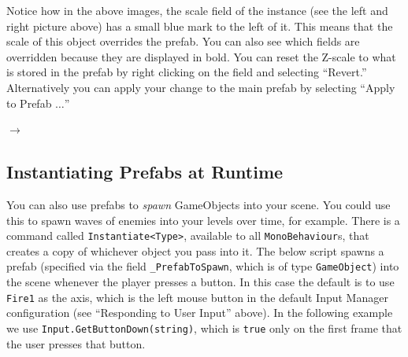 \documentclass[11pt]{article}
\begin{document}
Notice how in the above images, the scale field of the instance (see the left and right picture 
above) has a small blue mark to the left of it.  This means that the scale of this object overrides
the prefab.  You can also see which fields are overridden because they are displayed in bold.
You can reset the Z-scale to what is stored in the prefab by right clicking on the field and selecting
``Revert.''  Alternatively you can apply your change to the main prefab by selecting ``Apply to 
Prefab $\dots$''

\begin{center}
 $\rightarrow$
\end{center}

\subsection{Instantiating Prefabs at Runtime}

You can also use prefabs to \textit{spawn} GameObjects into your scene.  You could use this to spawn
waves of enemies into your levels over time, for example.  There is a command called 
\lstinline|Instantiate<Type>|, available to all \lstinline|MonoBehaviour|s, that creates a copy of
whichever object you pass into it.  The below script spawns a prefab (specified via the field
\lstinline|_PrefabToSpawn|, which is of type \lstinline|GameObject|) into the scene whenever the
player presses a button.  In this case the default is to use \lstinline|Fire1| as the axis, which
is the left mouse button in the default Input Manager configuration (see ``Responding to User 
Input'' above).  In the following example we use \lstinline|Input.GetButtonDown(string)|, 
which is \lstinline|true| only on the first frame that the user presses that button.\pagebreak
\end{document}
